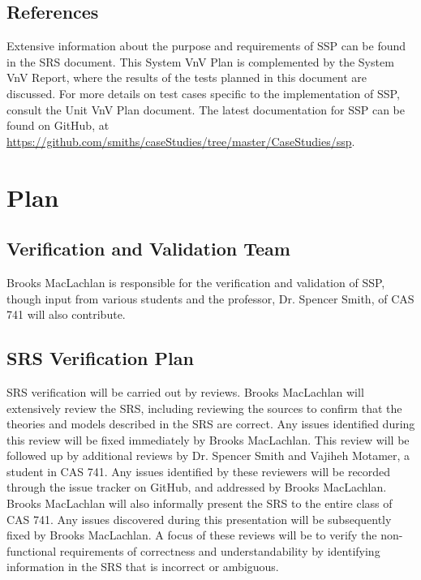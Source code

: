 \documentclass[12pt, titlepage]{article}
\newcommand{\progname}{SSP}
\begin{document}
\subsection{References}

\noindent Extensive information about the purpose and requirements of 
\progname{} can be found in the SRS document. This System VnV Plan is 
complemented by the System VnV Report, where the results of the tests planned 
in this document are discussed. For more details on test cases specific to the 
implementation of \progname{}, consult the Unit VnV Plan document. The latest 
documentation for \progname{} can be found on GitHub, at \newline 
\href{https://github.com/smiths/caseStudies/tree/master/CaseStudies/ssp}{https://github.com/smiths/caseStudies/tree/master/CaseStudies/ssp}.

\section{Plan} \label{sec_Plan}
	
\subsection{Verification and Validation Team}

\noindent Brooks MacLachlan is responsible for the verification and validation 
of \progname{}, though input from various students and the professor, Dr. 
Spencer 
Smith, of CAS 741 will also contribute.

\subsection{SRS Verification Plan}

\noindent SRS verification will be carried out by reviews. Brooks MacLachlan 
will extensively review the SRS, including reviewing the sources to confirm 
that the theories and models described in the SRS are correct. Any issues 
identified during this review will be fixed immediately by Brooks MacLachlan. 
This review will be followed up by additional reviews by Dr. Spencer Smith and 
Vajiheh Motamer, a student in CAS 741. Any issues identified by these reviewers 
will be recorded through the issue tracker on GitHub, and addressed by Brooks 
MacLachlan. Brooks MacLachlan will also informally present the SRS to the 
entire class of CAS 741. Any issues discovered during this presentation will be 
subsequently fixed by Brooks MacLachlan. A focus of these reviews will be to 
verify the non-functional requirements of correctness and understandability by 
identifying information in the SRS that is incorrect or ambiguous.
\end{document}
